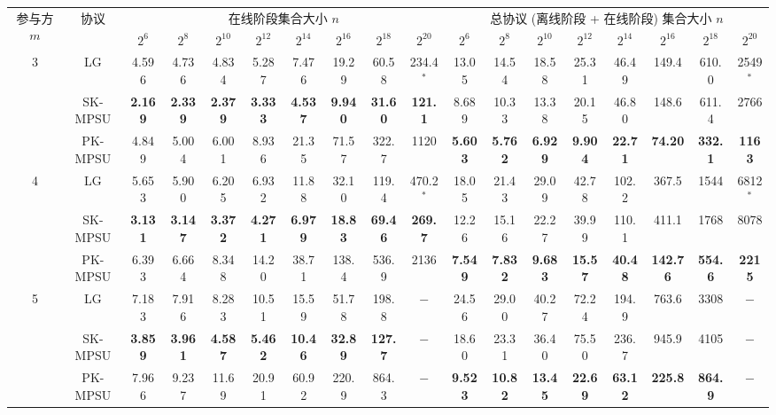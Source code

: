 \begin{table}[p]
\centering
\vspace*{\fill}

\begin{adjustbox}{angle=90,center,scale=0.85}
\begin{tabular}{|c|c|*{16}{c|}}
\hline
\multirow{2}{*}{参与方 $m$} & \multirow{2}{*}{协议} & \multicolumn{8}{c|}{在线阶段集合大小 $n$} & \multicolumn{8}{c|}{总协议 (离线阶段 + 在线阶段) 集合大小 $n$} \\ \cline{3-18} 
 & & $2^6$ & $2^8$ & $2^{10}$ & $2^{12}$ & $2^{14}$ & $2^{16}$ & $2^{18}$ & $2^{20}$ & $2^6$ & $2^8$ & $2^{10}$ & $2^{12}$ & $2^{14}$ & $2^{16}$ & $2^{18}$ & $2^{20}$ \\ \hline
\multirow{3}{*}{3}  
 & LG & 4.596 & 4.736 & 4.834 & 5.287 & 7.476 & 19.29 & 60.58 & 234.4$^*$ & 13.05 & 14.54 & 18.58 & 25.31 & 46.49 & 149.4 & 610.0 & 2549$^*$ \\ \cline{2-18} 
 & SK-MPSU & \textbf{2.169} & \textbf{2.339} & \textbf{2.379} & \textbf{3.333} & \textbf{4.537} & \textbf{9.940} & \textbf{31.60} & \textbf{121.1} & 8.689 & 10.33 & 13.38 & 20.15 & 46.80 & 148.6 & 611.4 & 2766 \\ \cline{2-18} 
 & PK-MPSU & 4.849 & 5.004 & 6.001 & 8.936 & 21.35 & 71.57 & 322.7 & 1120 & \textbf{5.603} & \textbf{5.762} & \textbf{6.929} & \textbf{9.904} & \textbf{22.71} & \textbf{74.20} & \textbf{332.1} & \textbf{1163} \\ \hline

\multirow{3}{*}{4}   
 & LG & 5.653 & 5.900 & 6.205 & 6.932 & 11.88 & 32.10 & 119.4 & 470.2$^*$ & 18.05 & 21.43 & 29.09 & 42.78 & 102.2 & 367.5 & 1544 & 6812$^*$ \\ \cline{2-18} 
 & SK-MPSU & \textbf{3.131} & \textbf{3.147} & \textbf{3.372} & \textbf{4.271} & \textbf{6.979} & \textbf{18.83} & \textbf{69.46} & \textbf{269.7} & 12.26 & 15.16 & 22.27 & 39.99 & 110.1 & 411.1 & 1768 & 8078 \\ \cline{2-18} 
 & PK-MPSU & 6.393 & 6.664 & 8.348 & 14.20 & 38.71 & 138.4 & 536.9 & 2136 & \textbf{7.549} & \textbf{7.832} & \textbf{9.683} & \textbf{15.57} & \textbf{40.48} & \textbf{142.76} & \textbf{554.6} & \textbf{2215} \\ \hline

\multirow{3}{*}{5}  
 & LG & 7.183 & 7.916 & 8.283 & 10.51 & 15.59 & 51.78 & 198.8 & $-$ & 24.56 & 29.00 & 40.27 & 72.24 & 194.9 & 763.6 & 3308 & $-$ \\ \cline{2-18} 
 & SK-MPSU & \textbf{3.859} & \textbf{3.961} & \textbf{4.587} & \textbf{5.462} & \textbf{10.46} & \textbf{32.89} & \textbf{127.7} & $-$ & 18.60 & 23.31 & 36.40 & 75.50 & 236.7 & 945.9 & 4105 & $-$ \\ \cline{2-18} 
 & PK-MPSU & 7.966 & 9.237 & 11.69 & 20.91 & 60.92 & 220.9 & 864.3 & $-$ & \textbf{9.523} & \textbf{10.82} & \textbf{13.45} & \textbf{22.69} & \textbf{63.12} & \textbf{225.8} & \textbf{864.9} & $-$ \\ \hline


\end{tabular}
\end{adjustbox}
\end{table}
